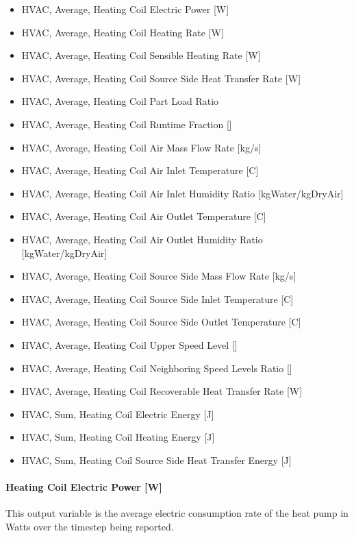 \begin{itemize}
\item
  HVAC, Average, Heating Coil Electric Power {[}W{]}
\item
  HVAC, Average, Heating Coil Heating Rate {[}W{]}
\item
  HVAC, Average, Heating Coil Sensible Heating Rate {[}W{]}
\item
  HVAC, Average, Heating Coil Source Side Heat Transfer Rate {[}W{]}
\item
  HVAC, Average, Heating Coil Part Load Ratio
\item
  HVAC, Average, Heating Coil Runtime Fraction {[]}
\item
  HVAC, Average, Heating Coil Air Mass Flow Rate {[}kg/s{]}
\item
  HVAC, Average, Heating Coil Air Inlet Temperature {[}C{]}
\item
  HVAC, Average, Heating Coil Air Inlet Humidity Ratio {[}kgWater/kgDryAir{]}
\item
  HVAC, Average, Heating Coil Air Outlet Temperature {[}C{]}
\item
  HVAC, Average, Heating Coil Air Outlet Humidity Ratio {[}kgWater/kgDryAir{]}
\item
  HVAC, Average, Heating Coil Source Side Mass Flow Rate {[}kg/s{]}
\item
  HVAC, Average, Heating Coil Source Side Inlet Temperature {[}C{]}
\item
  HVAC, Average, Heating Coil Source Side Outlet Temperature {[}C{]}
\item
  HVAC, Average, Heating Coil Upper Speed Level {[]}
\item
  HVAC, Average, Heating Coil Neighboring Speed Levels Ratio {[]}
\item
  HVAC, Average, Heating Coil Recoverable Heat Transfer Rate {[}W{]}
\item
  HVAC, Sum, Heating Coil Electric Energy {[}J{]}
\item
  HVAC, Sum, Heating Coil Heating Energy {[}J{]}
\item
  HVAC, Sum, Heating Coil Source Side Heat Transfer Energy {[}J{]}
\end{itemize}

\paragraph{Heating Coil Electric Power {[}W{]}}\label{heating-coil-electric-power-w-9}

This output variable is the average electric consumption rate of the heat pump in Watts over the timestep being reported.

